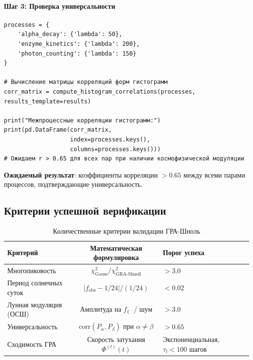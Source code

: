 \documentclass[12pt,a4paper]{article}
\theoremstyle{plain}
\theoremstyle{definition}
\theoremstyle{remark}
\newcommand{\GRA}{\text{GRA}}
\newcommand{\shnoll}{\text{Shnoll}}
\newcommand{\abs}[1]{\left|#1\right|}
\begin{document}
\paragraph{Шаг 3: Проверка универсальности}
\begin{lstlisting}[caption={Кросс-процессная корреляция гистограмм}, label={lst:universality-test}]
processes = {
    'alpha_decay': {'lambda': 50},
    'enzyme_kinetics': {'lambda': 200},
    'photon_counting': {'lambda': 150}
}

# Вычисление матрицы корреляций форм гистограмм
corr_matrix = compute_histogram_correlations(processes, results_template=results)

print("Межпроцессные корреляции гистограмм:")
print(pd.DataFrame(corr_matrix, 
                   index=processes.keys(), 
                   columns=processes.keys()))
# Ожидаем r > 0.65 для всех пар при наличии космофизической модуляции
\end{lstlisting}
\textbf{Ожидаемый результат}: коэффициенты корреляции $>0.65$ между всеми парами процессов, подтверждающие универсальность.

\subsection{Критерии успешной верификации}

\begin{table}[H]
\centering
\caption{Количественные критерии валидации ГРА-Шноль}
\label{tab:success-criteria}
\renewcommand{\arraystretch}{1.4}
\begin{tabular}{@{}lcp{6cm}c@{}}
\toprule
\textbf{Критерий} & \textbf{Математическая формулировка} & \textbf{Порог успеха} \\
\midrule
Многопиковость & $\chi^2_{\text{Gauss}} / \chi^2_{\GRA\text{-}\shnoll}$ & $> 3.0$ \\
\addlinespace
Период солнечных суток & $\abs{f_{\text{obs}} - 1/24} / (1/24)$ & $< 0.02$ \\
\addlinespace
Лунная модуляция (ОСШ) & Амплитуда на $f_{\leftmoon}$ / шум & $> 3.0$ \\
\addlinespace
Универсальность & $\text{corr}(P_{\alpha}, P_{\beta})$ при $\alpha \neq \beta$ & $> 0.65$ \\
\addlinespace
Сходимость ГРА & Скорость затухания $\Phi^{(l)}(t)$ & Экспоненциальная, $\tau_l < 100$ шагов \\
\bottomrule
\end{tabular}
\end{table}
\end{document}
